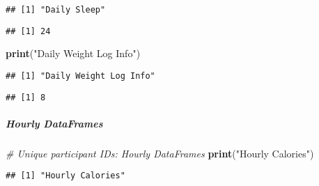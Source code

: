 \documentclass[
]{article}
\newenvironment{Shaded}{\begin{snugshade}}{\end{snugshade}}
\newcommand{\CommentTok}[1]{\textcolor[rgb]{0.56,0.35,0.01}{\textit{#1}}}
\newcommand{\FunctionTok}[1]{\textcolor[rgb]{0.13,0.29,0.53}{\textbf{#1}}}
\newcommand{\NormalTok}[1]{#1}
\newcommand{\SpecialCharTok}[1]{\textcolor[rgb]{0.81,0.36,0.00}{\textbf{#1}}}
\newcommand{\StringTok}[1]{\textcolor[rgb]{0.31,0.60,0.02}{#1}}
\begin{document}
\begin{verbatim}
## [1] "Daily Sleep"
\end{verbatim}

\begin{Shaded}
\end{Shaded}

\begin{verbatim}
## [1] 24
\end{verbatim}

\begin{Shaded}
\begin{Highlighting}[]
\FunctionTok{print}\NormalTok{(}\StringTok{"Daily Weight Log Info"}\NormalTok{)}
\end{Highlighting}
\end{Shaded}

\begin{verbatim}
## [1] "Daily Weight Log Info"
\end{verbatim}

\begin{Shaded}
\end{Shaded}

\begin{verbatim}
## [1] 8
\end{verbatim}

\hypertarget{hourly-dataframes-2}{%
\subparagraph{Hourly DataFrames}\label{hourly-dataframes-2}}

\begin{Shaded}
\begin{Highlighting}[]
\CommentTok{\# Unique participant IDs: Hourly DataFrames}
\FunctionTok{print}\NormalTok{(}\StringTok{"Hourly Calories"}\NormalTok{)}
\end{Highlighting}
\end{Shaded}

\begin{verbatim}
## [1] "Hourly Calories"
\end{verbatim}

\begin{Shaded}
\end{Shaded}
\end{document}
